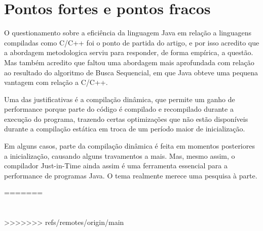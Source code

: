 \documentclass[12pt]{article}
\begin{document}
\section*{Pontos fortes e pontos fracos}
O questionamento sobre a eficiência da linguagem Java em relação a linguagens compiladas como C/C++
foi o ponto de partida do artigo, e por isso acredito que a abordagem metodologica
serviu para responder, de forma empírica, a questão. Mas também acredito que faltou uma abordagem mais
aprofundada com relação ao resultado do algoritmo de Busca Sequencial, em que Java obteve uma pequena vantagem
com relação a C/C++.

Uma das justificativas é a compilação dinâmica, que permite um ganho de performance
porque parte do código é compilado e recompilado durante
a execução do programa, trazendo certas optimizações que não estão
disponíveis durante a compilação estática em troca de um período maior de inicialização.

Em alguns casos, parte da compilação dinâmica é feita em momentos posteriores a inicialização, 
causando alguns travamentos a mais. Mas, mesmo assim, o compilador Just-in-Time
ainda assim é uma ferramenta essencial para a performance de programas Java. O tema realmente merece uma pesquisa à parte.



\printbibliography
=======
  \maketitle
  \abstract 
  \section{}
>>>>>>> refs/remotes/origin/main
\end{document}
